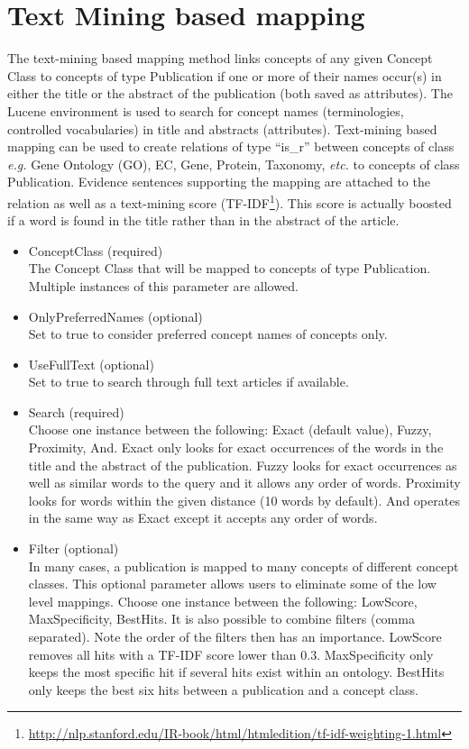 \section{Text Mining based mapping}
The text-mining based mapping method links concepts of any given Concept Class to concepts of type Publication
if one or more of their names occur(s) in either the title or the abstract of the publication (both saved as attributes).
The Lucene environment is used to search for concept names (terminologies, controlled vocabularies) in title and abstracts (attributes).
Text-mining based mapping can be used to create relations of type ``is\_r'' between concepts of class
{\it{e.g.}} Gene Ontology (GO), EC, Gene, Protein, Taxonomy, {\it{etc.}} to concepts of class Publication.
Evidence sentences supporting the mapping are attached to the relation
as well as a text-mining score (TF-IDF\footnote{\url{http://nlp.stanford.edu/IR-book/html/htmledition/tf-idf-weighting-1.html}}).
This score is actually boosted if a word is found in the title rather than in the abstract of the article.

\begin{itemize}
  \item{ConceptClass (required)}\\
  The Concept Class that will be mapped to concepts of type Publication.
  Multiple instances of this parameter are allowed.
  
  \item{OnlyPreferredNames (optional)}\\
  Set to true to consider preferred concept names of concepts only.
  
  \item{UseFullText (optional)}\\
  Set to true to search through full text articles if available.
  
  \item{Search (required)}\\
  Choose one instance between the following: Exact (default value), Fuzzy, Proximity, And.
  Exact only looks for exact occurrences of the words in the title and the abstract of the publication.
  Fuzzy looks for exact occurrences as well as similar words to the query and it allows any order of words.
  Proximity looks for words within the given distance (10 words by default).
  And operates in the same way as Exact except it accepts any order of words.
  
  \item{Filter (optional)}\\
  In many cases, a publication is mapped to many concepts of different concept classes.
  This optional parameter allows users to eliminate some of the low level mappings.
  Choose one instance between the following: LowScore, MaxSpecificity, BestHits.
  It is also possible to combine filters (comma separated).
  Note the order of the filters then has an importance.
  LowScore removes all hits with a TF-IDF score lower than 0.3.
  MaxSpecificity only keeps the most specific hit if several hits exist within an ontology.
  BestHits only keeps the best six hits between a publication and a concept class.

\end{itemize}

